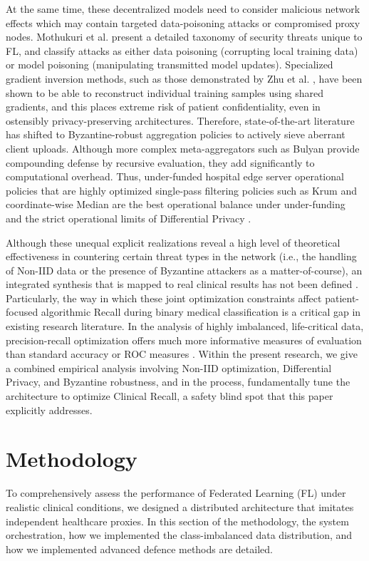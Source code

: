 \documentclass[conference]{IEEEtran}
\begin{document}
At the same time, these decentralized models need to consider malicious network effects which may contain targeted data-poisoning attacks or compromised proxy nodes. Mothukuri et al. \cite{mothukuri2021survey} present a detailed taxonomy of security threats unique to FL, and classify attacks as either data poisoning (corrupting local training data) or model poisoning (manipulating transmitted model updates). Specialized gradient inversion methods, such as those demonstrated by Zhu et al. \cite{zhu2019deep}, have been shown to be able to reconstruct individual training samples using shared gradients, and this places extreme risk of patient confidentiality, even in ostensibly privacy-preserving architectures. Therefore, state-of-the-art literature has shifted to Byzantine-robust aggregation policies to actively sieve aberrant client uploads. Although more complex meta-aggregators such as Bulyan \cite{mhamdi2018bulyan} provide compounding defense by recursive evaluation, they add significantly to computational overhead. Thus, under-funded hospital edge server operational policies that are highly optimized single-pass filtering policies such as Krum \cite{blanchard2017machine} and coordinate-wise Median \cite{yin2018byzantine} are the best operational balance under under-funding and the strict operational limits of Differential Privacy \cite{abadi2016deep}.

Although these unequal explicit realizations reveal a high level of theoretical effectiveness in countering certain threat types in the network (i.e., the handling of Non-IID data or the presence of Byzantine attackers as a matter-of-course), an integrated synthesis that is mapped to real clinical results has not been defined \cite{nguyen2022federated}. Particularly, the way in which these joint optimization constraints affect patient-focused algorithmic Recall during binary medical classification is a critical gap in existing research literature. In the analysis of highly imbalanced, life-critical data, precision-recall optimization offers much more informative measures of evaluation than standard accuracy or ROC measures \cite{saito2015precision}. Within the present research, we give a combined empirical analysis involving Non-IID optimization, Differential Privacy, and Byzantine robustness, and in the process, fundamentally tune the architecture to optimize Clinical Recall, a safety blind spot that this paper explicitly addresses.

\section{Methodology}
To comprehensively assess the performance of Federated Learning (FL) under realistic clinical conditions, we designed a distributed architecture that imitates independent healthcare proxies. In this section of the methodology, the system orchestration, how we implemented the class-imbalanced data distribution, and how we implemented advanced defence methods are detailed.
\end{document}
